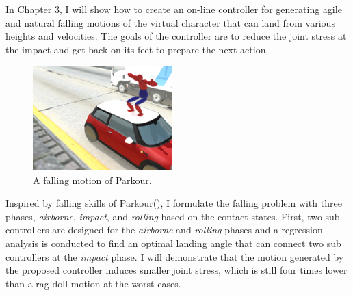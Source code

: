 In Chapter 3, I will show how to create an on-line controller for generating 
agile and natural falling motions of the virtual character that can land from 
various heights and velocities.
The goals of the controller are to reduce the joint stress at the impact and
get back on its feet to prepare the next action.

\begin{figure}
 \vspace{-25pt}
  \begin{center}
    \includegraphics[width=0.48\textwidth]{images/intro_landing.jpg}
  \end{center}
   \vspace{-25pt}
  \caption{A falling motion of Parkour.}
  \label{fig:intro_landing}
   \vspace{-10pt}
\end{figure}
Inspired by falling skills of Parkour(), 
I formulate the falling problem
with three phases, \emph{airborne}, \emph{impact}, and \emph{rolling}
based on the contact states.
First, two sub-controllers are designed for the \emph{airborne} and
\emph{rolling} phases and a regression analysis is conducted to find 
an optimal landing angle that can connect two sub controllers at the
\emph{impact} phase.
I will demonstrate that the motion generated by the proposed controller
induces smaller joint stress, which is still four times lower than a rag-doll
motion at the worst cases.



